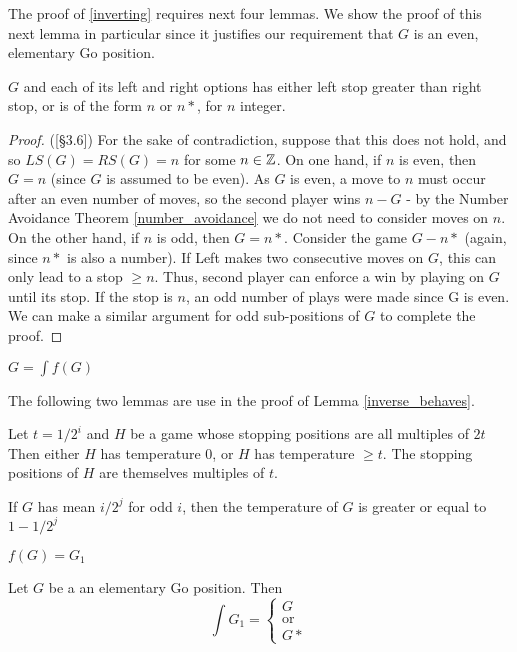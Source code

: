 \documentclass[../math194_paper.tex]{subfiles}
\begin{document}
 The proof of \ref{inverting} requires next four lemmas. We show the proof of this next
 lemma in particular since it justifies our requirement that $G$ is an even, elementary Go position.
\begin{lemma}
    $G$ and each of its left and right options has either left stop greater than 
    right stop, or is of the form $n$ or $n*$, for $n$ integer.
\end{lemma}
\begin{proof} \:
    (\cite{berlekamp1994mathematical}[\S 3.6])
    For the sake of contradiction, suppose that this does not hold, and
    so $LS(G) = RS(G) = n$ for some $n \in \mathbb{Z}$. 
    On one hand, if $n$ is even, then $G = n$ (since $G$ is assumed to be even). As $G$ is even, 
    a move to $n$ must occur after an even number of moves, so the second player wins
    $n -G$ - by the Number Avoidance Theorem \ref{number_avoidance} we do not need to consider moves
    on $n$. \\
    On the other hand, if $n$ is odd, then $G = n*$. Consider the game $G - n*$ (again, 
    since $n*$ is also a number). If Left makes two consecutive moves on $G$, this can only lead 
    to a stop $\geq n$. Thus, second player can enforce a win by playing on $G$ until its stop. If 
    the stop is $n$, an odd number of plays were made since G is even.\\
    
    We can make a similar argument for odd sub-positions of $G$ to complete the proof.
\end{proof}

\begin{lemma}
    \label{warming_inverse}
    $G  = \int f(G)$
\end{lemma}

The following two lemmas are use in the proof of Lemma \ref{inverse_behaves}.
\begin{lemma}
    Let $t=1/2^i$ and $H$ be a game whose stopping positions are all multiples of 
    $2t$ Then either $H$ has temperature 0, or $H$ has temperature $\geq t$. 
    The stopping positions of $H$ are themselves multiples of $t$.
\end{lemma}

\begin{lemma}
    If $G$ has mean $i/2^j$ for odd $i$, then the temperature of $G$ is 
    greater or equal to $1 - 1/2^j$
\end{lemma}

\begin{lemma}
    \label{inverse_behaves}
    $f(G) = G_1$
\end{lemma}

\begin{corollary}
    \label{inverting_dame}
    Let $G$ be a an elementary Go position. Then
    \[\int G_1 = \begin{cases}
        G \\
        \text{or} \\ 
        G*
    \end{cases}\]
\end{corollary}
\end{document}
